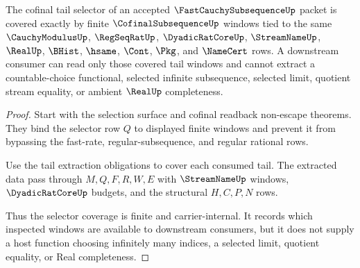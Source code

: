 \begin{theorem}
\label{thm:fast-cauchy-subsequence-tail-selector-coverage}
The cofinal tail selector of an accepted $\FastCauchySubsequenceUp$ packet is covered exactly by finite $\CofinalSubsequenceUp$ windows tied to the same $\CauchyModulusUp$, $\RegSeqRatUp$, $\DyadicRatCoreUp$, $\StreamNameUp$, $\RealUp$, $\BHist$, $\hsame$, $\Cont$, $\Pkg$, and $\NameCert$ rows. A downstream consumer can read only those covered tail windows and cannot extract a countable-choice functional, selected infinite subsequence, selected limit, quotient stream equality, or ambient $\RealUp$ completeness.
\end{theorem}
\begin{proof}
Start with the selection surface and cofinal readback non-escape theorems. They bind the selector row $Q$ to displayed finite windows and prevent it from bypassing the fast-rate, regular-subsequence, and regular rational rows.

Use the tail extraction obligations to cover each consumed tail. The extracted data pass through $M,Q,F,R,W,E$ with $\StreamNameUp$ windows, $\DyadicRatCoreUp$ budgets, and the structural $H,C,P,N$ rows.

Thus the selector coverage is finite and carrier-internal. It records which inspected windows are available to downstream consumers, but it does not supply a host function choosing infinitely many indices, a selected limit, quotient equality, or Real completeness.
\end{proof}

